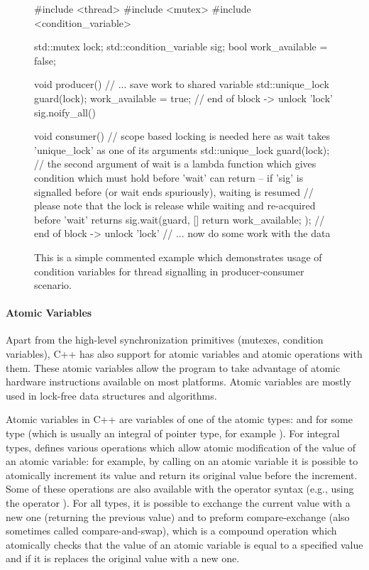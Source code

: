 \begin{figure}[tp]
    \begin{cppcode}
        #include <thread>
        #include <mutex>
        #include <condition_variable>

        std::mutex lock;
        std::condition_variable sig;
        bool work_available = false;

        void producer() {
            // ... save work to shared variable
            {
                std::unique_lock guard(lock);
                work_available = true;
            } // end of block -> unlock 'lock'
            sig.noify_all()
        }

        void consumer() {
            {
                // scope based locking is needed here as wait takes 'unique_lock' as one of its arguments
                std::unique_lock guard(lock);
                // the second argument of wait is a lambda function which gives condition which must hold before 'wait' can return -- if 'sig' is signalled before (or wait ends spuriously), waiting is resumed
                // please note that the lock is release while waiting and re-acquired before 'wait' returns
                sig.wait(guard, []{ return work_available; });
            } // end of block -> unlock 'lock'
            // ... now do some work with the data
        }
    \end{cppcode}
    \caption{This is a simple commented example which demonstrates usage of
    condition variables for thread signalling in producer-consumer scenario.
    }\label{fig:prelim:cppcond}
\end{figure}

\paragraph{Atomic Variables}

Apart from the high-level synchronization primitives (mutexes, condition
variables), C++ has also support for atomic variables and atomic operations
with them.
These atomic variables allow the program to take advantage of atomic hardware
instructions available on most platforms.
Atomic variables are mostly used in lock-free data structures and algorithms.

Atomic variables in C++ are variables of one of the atomic types:
 and  for some type  (which is
usually an integral of pointer type, for example ).
For integral types,  defines various operations which allow
atomic modification of the value of an atomic variable: for example, by calling
 on an atomic variable it is possible to atomically increment
its value and return its original value before the increment.
Some of these operations are also available with the operator syntax (e.g.,
using the operator \cpp{+=}).
For all types, it is possible to exchange the current value with a new one
(returning the previous value) and to preform compare-exchange (also sometimes
called compare-and-swap), which is a compound operation which atomically checks
that the value of an atomic variable is equal to a specified value and if it is
replaces the original value with a new one.

